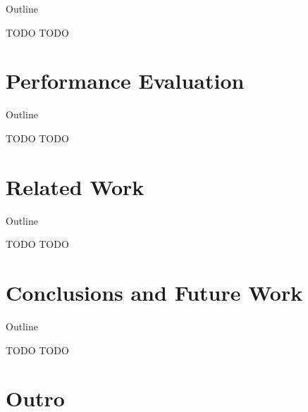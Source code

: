 \begin{frame}{Outline}
  \tableofcontents[current]
\end{frame}

\note{
}

\begin{frame}{TODO}
  TODO
\end{frame}

\note{
}


\section{Performance Evaluation}

\begin{frame}{Outline}
  \tableofcontents[current]
\end{frame}

\note{
}

\begin{frame}{TODO}
  TODO
\end{frame}

\note{
}


\section{Related Work}

\begin{frame}{Outline}
  \tableofcontents[current]
\end{frame}

\note{
}

\begin{frame}{TODO}
  TODO
\end{frame}

\note{
}


\section{Conclusions and Future Work}

\begin{frame}{Outline}
  \tableofcontents[current]
\end{frame}

\note{
}

\begin{frame}{TODO}
  TODO
\end{frame}

\note{
}


\section*{Outro}

